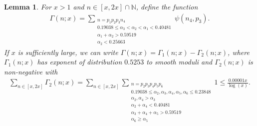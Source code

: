 \documentclass{amsart}
\newtheorem{lemma}{Lemma}
\numberwithin{equation}{section}
\begin{document}
\begin{lemma}\label{lem:4primes}
For $x>1$ and $n \in [x,2x]\cap \mathbb{N}$, define the function 
\begin{align*}
\Gamma(n;x)=\sum_{\substack{ n = p_1p_2p_3n_4 \\ 0.19038 \leq \alpha_3 <\alpha_2<\alpha_1 < 0.40481 \\ \alpha_1+\alpha_2 > 0.59519 \\ \alpha_2 < 0.25663}} \psi(n_4, p_3). 
\end{align*}
If $x$ is sufficiently large, we can write $\Gamma(n;x) = \Gamma_1(n;x) - \Gamma_2(n;x)$, where $\Gamma_1(n;x)$ has exponent of distribution $0.5253$ to smooth moduli and $\Gamma_2(n;x)$ is non-negative with 
\begin{align*}
\sum_{n \in [x,2x]} \Gamma_2(n;x)  = \sum_{n \in [x,2x]} \sum_{\substack{ n = p_2p_3p_4p_5p_6 \\ 0.19038 \leq \alpha_2, \alpha_3, \alpha_4, \alpha_5, \alpha_6 \leq 0.23848  \\ \alpha_2, \alpha_4 > \alpha_3  \\ \alpha_2+\alpha_4 < 0.40481\\ \alpha_3 + \alpha_4 + \alpha_5 >0.59519 \\   \alpha_6 \geq \alpha_5 }} 1 \leq \frac{0.00001x}{\log(x)}.
\end{align*}
\end{lemma}
\end{document}
